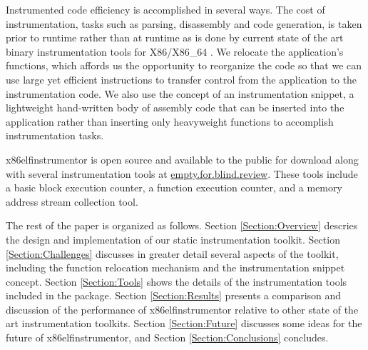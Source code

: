 Instrumented code efficiency is accomplished in several ways. The cost of
instrumentation, tasks such as parsing, disassembly and code generation, is
taken prior to runtime rather than at runtime as is done by current state of the
art binary instrumentation tools for X86/X86\_64 \cite{luk2005pin,
nethercote2007valgrind, dynamorio}. We relocate the application's
functions, which affords us the opportunity to reorganize the code so that we
can use large yet efficient instructions to transfer control from the
application to the instrumentation code. We also use the concept of an
instrumentation snippet, a lightweight hand-written body of assembly code that can
be inserted into the application rather than inserting only heavyweight
functions to accomplish instrumentation tasks.

x86elfinstrumentor is open source and available to the public for download along with several
instrumentation tools at \url{empty.for.blind.review}. These tools include a basic block
execution counter, a function execution counter, and a memory address stream collection tool.

The rest of the paper is organized as follows. Section
\ref{Section:Overview} descries the design and implementation of our static
instrumentation toolkit. Section \ref{Section:Challenges} discusses in greater detail
several aspects of the toolkit, including the function relocation mechanism and the
instrumentation snippet concept. Section \ref{Section:Tools} shows the details of
the instrumentation tools included in the package. Section \ref{Section:Results}
presents a comparison and discussion of the performance of x86elfinstrumentor relative
to other state of the art instrumentation toolkits. Section
\ref{Section:Future} discusses some ideas for the future of x86elfinstrumentor,
and Section \ref{Section:Conclusions} concludes.
